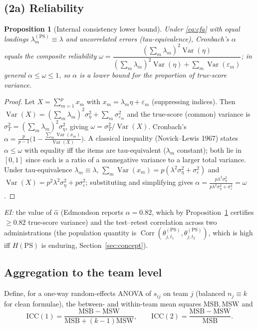 \documentclass{amsart}
\newtheorem{proposition}{Proposition}
\theoremstyle{remark}
\begin{document}
\subsection{(2a) Reliability}\label{sec:rel}
\begin{proposition}[Internal consistency lower bound]\label{prop:alpha}
Under \eqref{eq:cfa} with equal loadings $\lambda^{(\mathrm{PS})}_m\equiv\lambda$
and uncorrelated errors (tau-equivalence), Cronbach's $\alpha$ equals the
composite reliability
$\omega=\dfrac{(\sum_m\lambda_m)^2\operatorname{Var}(\eta)}
{(\sum_m\lambda_m)^2\operatorname{Var}(\eta)+\sum_m\operatorname{Var}(\varepsilon_m)}$;
in general $\alpha\le\omega\le 1$, so $\alpha$ is a lower bound for the proportion
of true-score variance.
\end{proposition}
\begin{proof}
Let $X=\sum_{m=1}^{p}x_m$ with $x_m=\lambda_m\eta+\varepsilon_m$ (suppressing
indices). Then $\operatorname{Var}(X)=(\sum_m\lambda_m)^2\sigma^2_\eta
+\sum_m\sigma^2_{\varepsilon_m}$ and the true-score (common) variance is
$\sigma^2_T=(\sum_m\lambda_m)^2\sigma^2_\eta$, giving $\omega=\sigma_T^2/\operatorname{Var}(X)$.
Cronbach's $\alpha=\frac{p}{p-1}\big(1-\frac{\sum_m\operatorname{Var}(x_m)}{\operatorname{Var}(X)}\big)$.
A classical inequality (Novick--Lewis 1967) states $\alpha\le\omega$ with equality
iff the items are tau-equivalent ($\lambda_m$ constant); both lie in $[0,1]$ since
each is a ratio of a nonnegative variance to a larger total variance. Under
tau-equivalence $\lambda_m\equiv\lambda$, $\sum_m\operatorname{Var}(x_m)=p(\lambda^2\sigma_\eta^2+\sigma_\varepsilon^2)$
and $\operatorname{Var}(X)=p^2\lambda^2\sigma_\eta^2+p\sigma_\varepsilon^2$; substituting and
simplifying gives $\alpha=\frac{p\lambda^2\sigma_\eta^2}{p\lambda^2\sigma_\eta^2+\sigma_\varepsilon^2}=\omega$.
\end{proof}
\emph{EI:} the value of $\hat\alpha$ (Edmondson reports $\alpha=0.82$, which by
Proposition~\ref{prop:alpha} certifies $\ge 0.82$ true-score variance) and the
test--retest correlation across two administrations (the population quantity is
$\operatorname{Corr}(\theta^{(\mathrm{PS})}_{j,t_1},\theta^{(\mathrm{PS})}_{j,t_2})$, which is
high iff $H(\mathrm{PS})$ is enduring, Section~\ref{sec:concept}).

\subsection{Aggregation to the team level}\label{sec:agg}
Define, for a one-way random-effects ANOVA of $s_{ij}$ on team $j$ (balanced
$n_j\equiv k$ for clean formulae), the between- and within-team mean squares
$\mathrm{MSB},\mathrm{MSW}$ and
\begin{equation}\label{eq:icc}
\mathrm{ICC}(1)=\frac{\mathrm{MSB}-\mathrm{MSW}}{\mathrm{MSB}+(k-1)\mathrm{MSW}},
\qquad
\mathrm{ICC}(2)=\frac{\mathrm{MSB}-\mathrm{MSW}}{\mathrm{MSB}} .
\end{equation}
\end{document}
